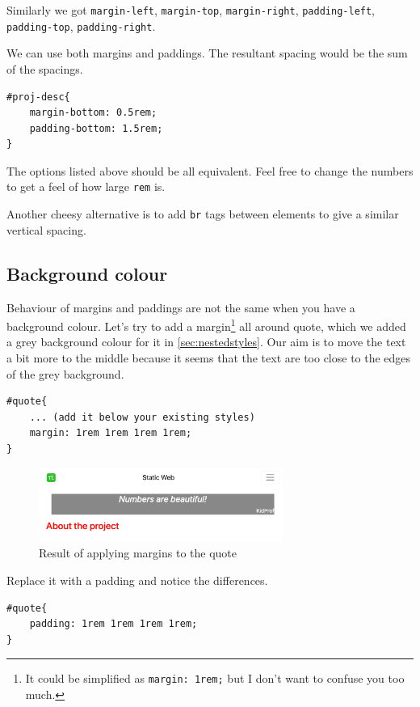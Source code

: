 Similarly we got \texttt{margin-left}, \texttt{margin-top}, \texttt{margin-right}, \texttt{padding-left}, \texttt{padding-top}, \texttt{padding-right}. 

We can use both margins and paddings. The resultant spacing would be the sum of the spacings. 

\begin{lstlisting}[language=pug]
#proj-desc{
    margin-bottom: 0.5rem;
    padding-bottom: 1.5rem;
}
\end{lstlisting}

The options listed above should be all equivalent. Feel free to change the numbers to get a feel of how large \texttt{rem} is.
\vspace{6mm}

Another cheesy alternative is to add \texttt{br} tags between elements to give a similar vertical spacing. 

\subsection*{Background colour}

Behaviour of margins and paddings are not the same when you have a background colour. Let's try to add a margin\footnote{It could be simplified as \texttt{margin: 1rem;} but I don't want to confuse you too much.} all around quote, which we added a grey background colour for it in \cref{sec:nestedstyles}. Our aim is to move the text a bit more to the middle because it seems that the text are too close to the edges of the grey background.

\begin{lstlisting}[language=pug]
#quote{
    ... (add it below your existing styles)
    margin: 1rem 1rem 1rem 1rem;
}
\end{lstlisting}

\begin{figure}[H]
\centering
\includegraphics[width=8cm]{images/chn6-quote-margin.png}
\caption{Result of applying margins to the quote}
\end{figure}

Replace it with a padding and notice the differences.

\begin{lstlisting}[language=pug]
#quote{
    padding: 1rem 1rem 1rem 1rem;
}
\end{lstlisting}


